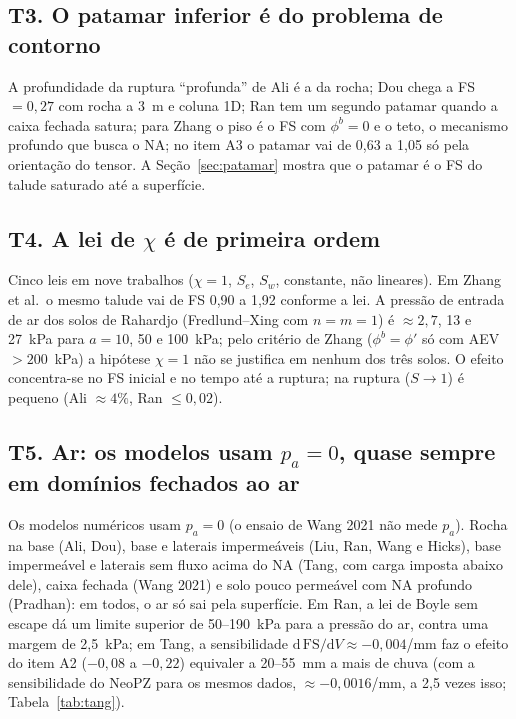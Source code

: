 \subsection{T3. O patamar inferior \'e do problema de contorno}

A profundidade da ruptura ``profunda'' de Ali \'e a da rocha; Dou chega a FS $=0{,}27$ com rocha a 3~m e coluna 1D; Ran
tem um segundo patamar quando a caixa fechada satura; para Zhang o piso \'e o FS com $\phi^b=0$ e o teto, o mecanismo
profundo que busca o NA; no item A3 o patamar vai de 0,63 a 1,05 s\'o pela orienta\c{c}\~ao do tensor. A
Se\c{c}\~ao~\ref{sec:patamar} mostra que o patamar \'e o FS do talude saturado at\'e a superf\'icie.

\subsection{T4. A lei de $\chi$ \'e de primeira ordem}

Cinco leis em nove trabalhos ($\chi=1$, $S_e$, $S_w$, constante, n\~ao lineares). Em Zhang et al.\ o mesmo talude vai de
FS 0,90 a 1,92 conforme a lei. A press\~ao de entrada de ar dos solos de Rahardjo (Fredlund--Xing com
$n=m=1$) \'e $\approx2{,}7$, 13 e 27~kPa para $a=10$, 50 e 100~kPa; pelo crit\'erio de Zhang ($\phi^b=\phi'$ s\'o com
AEV $>200$~kPa) a hip\'otese $\chi=1$ n\~ao se justifica em nenhum dos tr\^es solos. O efeito concentra-se no FS
inicial e no tempo at\'e a ruptura; na ruptura ($S\to1$) \'e pequeno (Ali $\approx4\%$, Ran $\le0{,}02$).

\subsection{T5. Ar: os modelos usam $p_a=0$, quase sempre em dom\'inios fechados ao ar}

Os modelos num\'ericos usam $p_a=0$ (o ensaio de Wang 2021 n\~ao mede $p_a$). Rocha na base (Ali, Dou), base e
laterais imperme\'aveis (Liu, Ran, Wang e Hicks), base imperme\'avel e laterais sem fluxo acima do NA (Tang, com carga
imposta abaixo dele), caixa fechada (Wang 2021) e solo pouco perme\'avel com NA profundo (Pradhan): em todos, o ar s\'o
sai pela superf\'icie. Em Ran, a lei de Boyle sem escape d\'a um limite superior de 50--190~kPa para a press\~ao do ar,
contra uma margem de 2,5~kPa; em Tang, a sensibilidade $\mathrm{d}\,\mathrm{FS}/\mathrm{d}V\approx-0{,}004$/mm faz o
efeito do item A2 ($-0{,}08$ a $-0{,}22$) equivaler a 20--55~mm a mais de chuva (com a sensibilidade do NeoPZ para os
mesmos dados, $\approx-0{,}0016$/mm, a 2,5 vezes isso; Tabela~\ref{tab:tang}).

